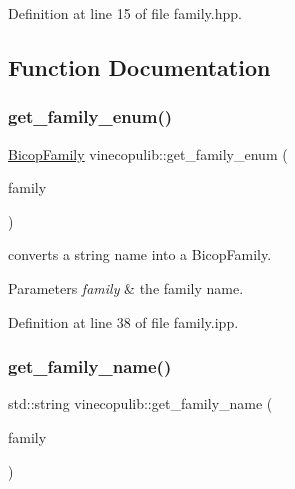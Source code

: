 Definition at line 15 of file family.\+hpp.



\subsection{Function Documentation}
\mbox{\label{namespacevinecopulib_a8d5285a58e0d250a5226715754e12568}} 
\subsubsection{\texorpdfstring{get\+\_\+family\+\_\+enum()}{get\_family\_enum()}}
{\footnotesize\ttfamily \hyperlink{namespacevinecopulib_a42e95cc06d33896199caab0c11ad44f3}{Bicop\+Family} vinecopulib\+::get\+\_\+family\+\_\+enum (\begin{DoxyParamCaption}\item[{std\+::string}]{family }\end{DoxyParamCaption})\hspace{0.3cm}{\ttfamily [inline]}}

converts a string name into a Bicop\+Family. 
\begin{DoxyParams}{Parameters}
{\em family} & the family name. \\
\hline
\end{DoxyParams}


Definition at line 38 of file family.\+ipp.

\mbox{\label{namespacevinecopulib_ac46553ae5f99072f65e9d3254d2c526d}} 
\subsubsection{\texorpdfstring{get\+\_\+family\+\_\+name()}{get\_family\_name()}}
{\footnotesize\ttfamily std\+::string vinecopulib\+::get\+\_\+family\+\_\+name (\begin{DoxyParamCaption}\item[{\hyperlink{namespacevinecopulib_a42e95cc06d33896199caab0c11ad44f3}{Bicop\+Family}}]{family }\end{DoxyParamCaption})\hspace{0.3cm}{\ttfamily [inline]}}

